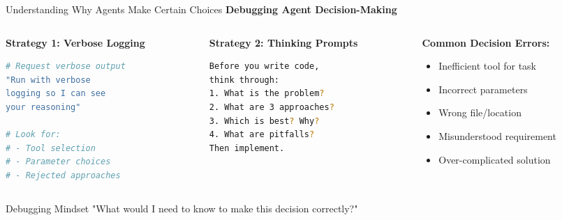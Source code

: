 \documentclass[aspectratio=169,11pt]{beamer}
\begin{document}
\begin{frame}[fragile]{Understanding Why Agents Make Certain Choices}
    \textbf{Debugging Agent Decision-Making}

    \begin{columns}[T]
        \begin{column}{0.32\textwidth}
            \textbf{Strategy 1: Verbose Logging}
            \begin{lstlisting}[language=Bash]
# Request verbose output
"Run with verbose
logging so I can see
your reasoning"

# Look for:
# - Tool selection
# - Parameter choices
# - Rejected approaches
            \end{lstlisting}
        \end{column}
        \begin{column}{0.32\textwidth}
            \textbf{Strategy 2: Thinking Prompts}
            \begin{lstlisting}[language=Bash]
Before you write code,
think through:
1. What is the problem?
2. What are 3 approaches?
3. Which is best? Why?
4. What are pitfalls?
Then implement.
            \end{lstlisting}
        \end{column}
        \begin{column}{0.32\textwidth}
            \textbf{Common Decision Errors:}
            \begin{itemize}
                \item Inefficient tool for task
                \item Incorrect parameters
                \item Wrong file/location
                \item Misunderstood requirement
                \item Over-complicated solution
            \end{itemize}
        \end{column}
    \end{columns}

    \vspace{0.3cm}
    \begin{block}{Debugging Mindset}
        "What would I need to know to make this decision correctly?"
    \end{block}
\end{frame}
\end{document}
